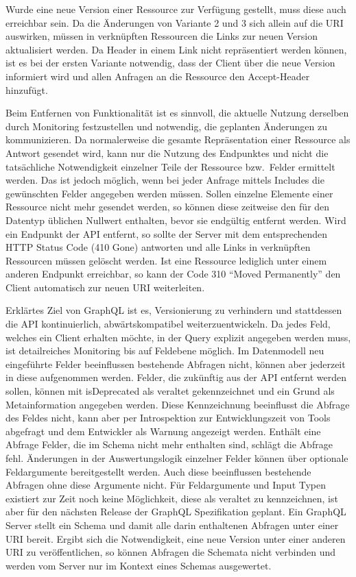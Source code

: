 Wurde eine neue Version einer Ressource zur Verfügung gestellt, muss diese auch erreichbar sein.
Da die Änderungen von Variante 2 und 3 sich allein auf die URI auswirken, müssen in verknüpften Ressourcen die Links zur neuen Version aktualisiert werden.
Da Header in einem Link nicht repräsentiert werden können, ist es bei der ersten Variante notwendig, dass der Client über die neue Version informiert wird und allen Anfragen an die Ressource den Accept-Header hinzufügt.
\par
Beim Entfernen von Funktionalität ist es sinnvoll, die aktuelle Nutzung derselben durch Monitoring festzustellen und notwendig, die geplanten Änderungen zu kommunizieren.
Da normalerweise die gesamte Repräsentation einer Ressource als Antwort gesendet wird, kann nur die Nutzung des Endpunktes und nicht die tatsächliche Notwendigkeit einzelner Teile der Ressource bzw.\ Felder ermittelt werden.
Das ist jedoch möglich, wenn bei jeder Anfrage mittels Includes die gewünschten Felder angegeben werden müssen.
Sollen einzelne Elemente einer Ressource nicht mehr gesendet werden, so können diese zeitweise den für den Datentyp üblichen Nullwert enthalten, bevor sie endgültig entfernt werden.
Wird ein Endpunkt der API entfernt, so sollte der Server mit dem entsprechenden HTTP Status Code (410 Gone) antworten und alle Links in verknüpften Ressourcen müssen gelöscht werden.
Ist eine Ressource lediglich unter einem anderen Endpunkt erreichbar, so kann der Code 310 \enquote{Moved Permanently} den Client automatisch zur neuen URI weiterleiten.
\par
Erklärtes Ziel von GraphQL ist es, Versionierung zu verhindern und stattdessen die API kontinuierlich, abwärtskompatibel weiterzuentwickeln.
Da jedes Feld, welches ein Client erhalten möchte, in der Query explizit angegeben werden muss, ist detailreiches Monitoring bis auf Feldebene möglich.
Im Datenmodell neu eingeführte Felder beeinflussen bestehende Abfragen nicht, können aber jederzeit in diese aufgenommen werden.
Felder, die zukünftig aus der API entfernt werden sollen, können mit isDeprecated als veraltet gekennzeichnet und ein Grund als Metainformation angegeben werden.
Diese Kennzeichnung beeinflusst die Abfrage des Feldes nicht, kann aber per Introspektion zur Entwicklungszeit von Tools abgefragt und dem Entwickler als Warnung angezeigt werden.
Enthält eine Abfrage Felder, die im Schema nicht mehr enthalten sind, schlägt die Abfrage fehl.
Änderungen in der Auswertungslogik einzelner Felder können über optionale Feldargumente bereitgestellt werden.
Auch diese beeinflussen bestehende Abfragen ohne diese Argumente nicht.
Für Feldargumente und Input Typen existiert zur Zeit noch keine Möglichkeit, diese als veraltet zu kennzeichnen, ist aber für den nächsten Release der GraphQL Spezifikation geplant.
Ein GraphQL Server stellt ein Schema und damit alle darin enthaltenen Abfragen unter einer URI bereit.
Ergibt sich die Notwendigkeit, eine neue Version unter einer anderen URI zu veröffentlichen, so können Abfragen die Schemata nicht verbinden und werden vom Server nur im Kontext eines Schemas ausgewertet.
